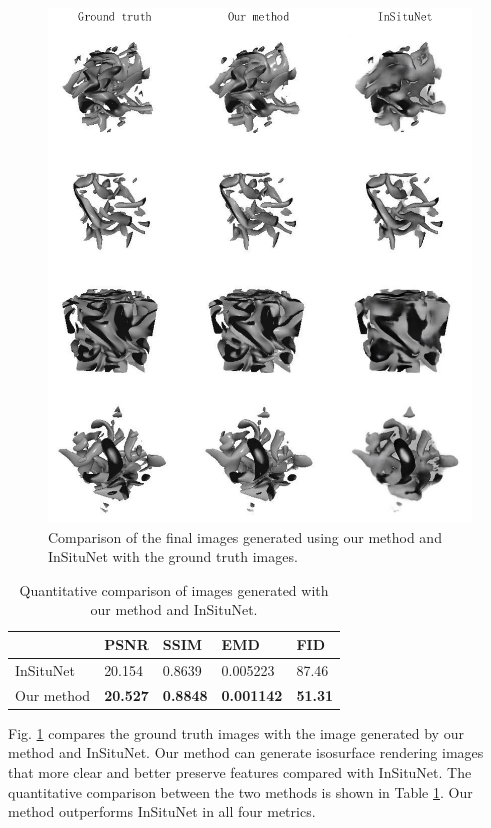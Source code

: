 \documentclass[journal]{vgtc}                %
\begin{document}
\begin{figure}
  \centering
  \includegraphics[width=1\linewidth]{baseline}
  \caption{Comparison of the final images generated using our method and InSituNet with the ground truth images. }
  \label{fig:baseline}
\end{figure}

\begin{table}
\caption{Quantitative comparison of images generated with our method and InSituNet. }
    \centering
    \begin{tabular}{l|l|l|l|l}
         & PSNR & SSIM & EMD & FID \\  \hline
         InSituNet & 20.154 & 0.8639 & 0.005223 & 87.46   \\ \hline
         Our method & \textbf{20.527} & \textbf{0.8848} & \textbf{0.001142} & \textbf{51.31}  \\ 
    \end{tabular}
    \label{table:baseline}
\end{table}

Fig. \ref{fig:baseline} compares the ground truth images with the image generated by our method and InSituNet. Our method can generate isosurface rendering images that more clear and better preserve features compared with InSituNet. The quantitative comparison between the two methods is shown in Table \ref{table:baseline}. Our method outperforms InSituNet in all four metrics. 
\end{document}
